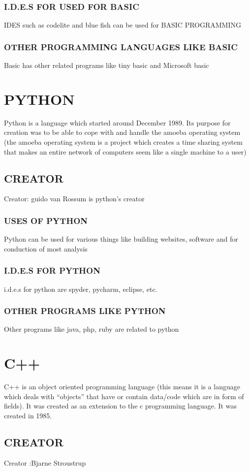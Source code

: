 \documentclass{article}
\begin{document}
		\subsubsection{I.D.E.S FOR USED FOR BASIC}
		IDES such as codelite and blue fish can be used for BASIC PROGRAMMING
		\subsubsection{OTHER PROGRAMMING LANGUAGES LIKE BASIC}
		Basic has other related programs like tiny basic and Microsoft basic
		\section{PYTHON}
		Python is a language which started around December 1989. 
		Its purpose for creation was to be able to cope with and handle the amoeba operating system (the amoeba operating system is a project which creates a time sharing system that makes an entire network of computers seem like a single machine to a user)
		\subsection{CREATOR}
		Creator: guido van Rossum is python’s creator
		\subsubsection{USES OF PYTHON}
		Python can be used for various things like building websites,
		software and for conduction of most analysis
		\subsubsection{I.D.E.S FOR PYTHON}
		i.d.e.s for python are spyder, pycharm, eclipse, etc.
		\subsubsection{OTHER PROGRAMS LIKE PYTHON}
		Other programs like java, php, ruby are related to python
			\section{C++}
		C++ is an object oriented programming language (this means it is a language which deals with “objects” that have or contain data/code which are in form of fields). It was created as an extension to the c programming language. It was created in 1985.
		\subsection{CREATOR}
		Creator :Bjarne Stroustrup
\end{document}
